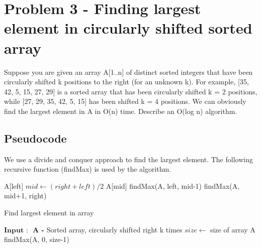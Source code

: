 \documentclass[12pt]{article}
\begin{document}
\section{Problem 3 - Finding largest element in circularly shifted sorted array}
Suppose you are given an array A[1..n] of distinct sorted integers that have been circularly shifted
k positions to the right (for an unknown k). For example, [35, 42, 5, 15, 27, 29] is a sorted array that has been
circularly shifted k = 2 positions, while [27, 29, 35, 42, 5, 15] has been shifted k = 4 positions.
We can obviously find the largest element in A in O(n) time. Describe an O(log n) algorithm.
\subsection{Pseudocode}
We use a divide and conquer approach to find the largest element. The following recursive function (findMax) is used by the algorithm.
  \begin{algorithm}[H]
    \begin{algorithmic}
    
        \State \Return A[left]
    \EndIf
    \State $mid \gets (right + left)/ 2$  
        \State \Return A[mid]
        \State \Return findMax(A, left, mid-1)
    \Else
        \State \Return findMax(A, mid+1, right)
    \EndIf
    \EndFunction
    \end{algorithmic}
    \end{algorithm}
    
\begin{algorithm}[H]
    \caption{Find largest element in array}\label{alg:mst}
    \begin{algorithmic}
    \State $\textbf{Input : } $
    {\textbf{A - } Sorted array, circularly shifted right k times} 
    \State $size \gets$ size of array A
    \State \Return findMax(A, 0, size-1)
    \end{algorithmic}
\end{algorithm}
\end{document}
